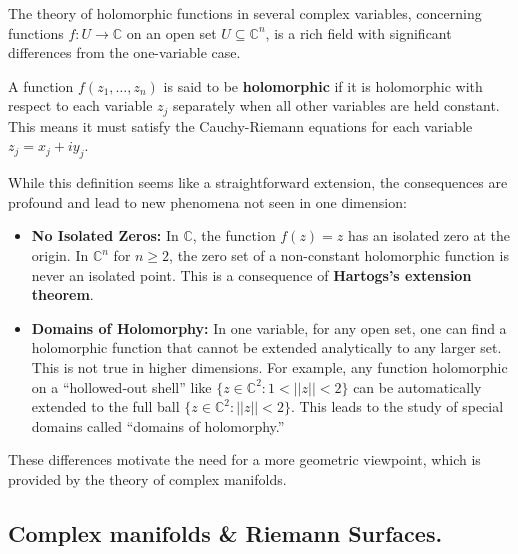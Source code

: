 \documentclass{article}
\begin{document}
The theory of holomorphic functions in several complex variables, concerning functions $f: U \to \mathbb{C}$ on an open set $U \subseteq \mathbb{C}^n$, is a rich field with significant differences from the one-variable case.
\begin{definition}
A function $f(z_1, \dots, z_n)$ is said to be \textbf{holomorphic} if it is holomorphic with respect to each variable $z_j$ separately when all other variables are held constant. This means it must satisfy the Cauchy-Riemann equations for each variable $z_j = x_j + iy_j$.
\end{definition}
While this definition seems like a straightforward extension, the consequences are profound and lead to new phenomena not seen in one dimension:
\begin{itemize}
    \item \textbf{No Isolated Zeros:} In $\mathbb{C}$, the function $f(z)=z$ has an isolated zero at the origin. In $\mathbb{C}^n$ for $n \ge 2$, the zero set of a non-constant holomorphic function is never an isolated point. This is a consequence of \textbf{Hartogs's extension theorem}.
    \item \textbf{Domains of Holomorphy:} In one variable, for any open set, one can find a holomorphic function that cannot be extended analytically to any larger set. This is not true in higher dimensions. For example, any function holomorphic on a ``hollowed-out shell'' like $\{z \in \mathbb{C}^2 : 1 < ||z|| < 2\}$ can be automatically extended to the full ball $\{z \in \mathbb{C}^2 : ||z|| < 2\}$. This leads to the study of special domains called ``domains of holomorphy.''
\end{itemize}
These differences motivate the need for a more geometric viewpoint, which is provided by the theory of complex manifolds.

\subsection{Complex manifolds \& Riemann Surfaces.}
\end{document}
